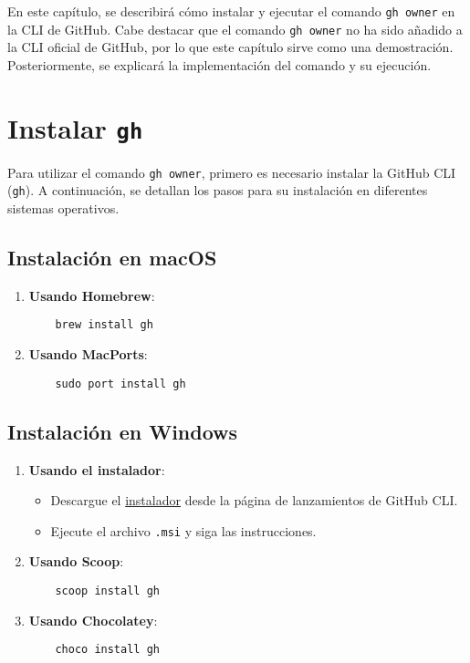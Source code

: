 En este capítulo, se describirá cómo instalar y ejecutar el comando \texttt{gh owner} en la CLI de GitHub. Cabe destacar que el comando \texttt{gh owner} no ha sido añadido a la CLI oficial de GitHub, por lo que este capítulo sirve como una demostración. Posteriormente, se explicará la implementación del comando y su ejecución.

\section{Instalar \texttt{gh}}

Para utilizar el comando \texttt{gh owner}, primero es necesario instalar la GitHub CLI (\texttt{gh}). A continuación, se detallan los pasos para su instalación en diferentes sistemas operativos.

\subsection{Instalación en macOS}

\begin{enumerate}
    \item \textbf{Usando Homebrew}:
    \begin{verbatim}
    brew install gh
    \end{verbatim}
    \item \textbf{Usando MacPorts}:
    \begin{verbatim}
    sudo port install gh
    \end{verbatim}
\end{enumerate}

\subsection{Instalación en Windows}

\begin{enumerate}
    \item \textbf{Usando el instalador}:
    \begin{itemize}
        \item Descargue el \href{https://github.com/cli/cli/releases}{instalador} desde la página de lanzamientos de GitHub CLI.
        \item Ejecute el archivo \texttt{.msi} y siga las instrucciones.
    \end{itemize}
    \item \textbf{Usando Scoop}:
    \begin{verbatim}
    scoop install gh
    \end{verbatim}
    \item \textbf{Usando Chocolatey}:
    \begin{verbatim}
    choco install gh
    \end{verbatim}
\end{enumerate}

